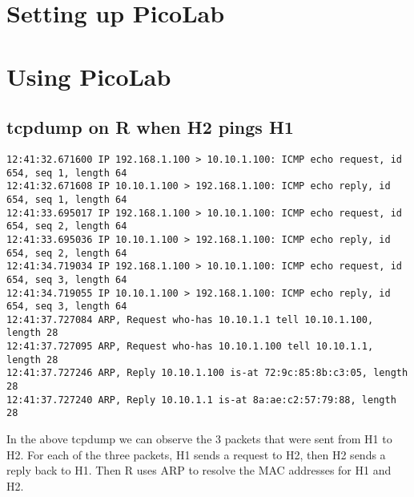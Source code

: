 \documentclass[
	letterpaper, %
	10pt, %
]{CSUniSchoolLabReport}
\begin{document}
\section{Setting up PicoLab}
\section{Using PicoLab}

\subsection{tcpdump on R when H2 pings H1}

\begin{center}
\begin{verbatim}
12:41:32.671600 IP 192.168.1.100 > 10.10.1.100: ICMP echo request, id 654, seq 1, length 64
12:41:32.671608 IP 10.10.1.100 > 192.168.1.100: ICMP echo reply, id 654, seq 1, length 64
12:41:33.695017 IP 192.168.1.100 > 10.10.1.100: ICMP echo request, id 654, seq 2, length 64
12:41:33.695036 IP 10.10.1.100 > 192.168.1.100: ICMP echo reply, id 654, seq 2, length 64
12:41:34.719034 IP 192.168.1.100 > 10.10.1.100: ICMP echo request, id 654, seq 3, length 64
12:41:34.719055 IP 10.10.1.100 > 192.168.1.100: ICMP echo reply, id 654, seq 3, length 64
12:41:37.727084 ARP, Request who-has 10.10.1.1 tell 10.10.1.100, length 28
12:41:37.727095 ARP, Request who-has 10.10.1.100 tell 10.10.1.1, length 28
12:41:37.727246 ARP, Reply 10.10.1.100 is-at 72:9c:85:8b:c3:05, length 28
12:41:37.727240 ARP, Reply 10.10.1.1 is-at 8a:ae:c2:57:79:88, length 28
\end{verbatim}
\end{center}

In the above tcpdump we can observe the 3 packets that were sent from H1 to 
H2. For each of the three packets, H1 sends a request to H2, then H2 sends a reply back to H1.
Then R uses ARP to resolve the MAC addresses for H1 and H2.

\section{}
\end{document}

